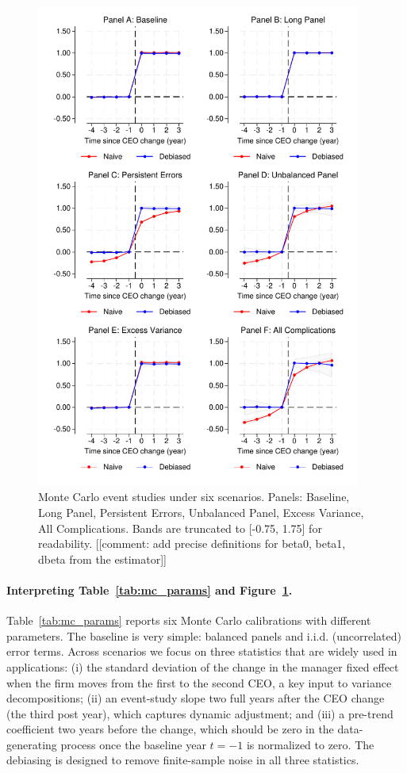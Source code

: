 \documentclass[11pt,a4paper]{article}
\begin{document}
\begin{figure}[htbp]
\centering
\includegraphics[width=0.95\textwidth]{figure/figuremc.pdf}
\caption{Monte Carlo event studies under six scenarios. Panels: Baseline, Long Panel, Persistent Errors, Unbalanced Panel, Excess Variance, All Complications. Bands are truncated to [-0.75, 1.75] for readability. [[comment: add precise definitions for beta0, beta1, dbeta from the estimator]]}
\label{fig:mc}
\end{figure}

\paragraph{Interpreting Table~\ref{tab:mc_params} and Figure~\ref{fig:mc}.}
Table~\ref{tab:mc_params} reports six Monte Carlo calibrations with different parameters. The baseline is very simple: balanced panels and i.i.d. (uncorrelated) error terms. Across scenarios we focus on three statistics that are widely used in applications: (i) the standard deviation of the change in the manager fixed effect when the firm moves from the first to the second CEO, a key input to variance decompositions; (ii) an event-study slope two full years after the CEO change (the third post year), which captures dynamic adjustment; and (iii) a pre-trend coefficient two years before the change, which should be zero in the data-generating process once the baseline year $t=-1$ is normalized to zero. The debiasing is designed to remove finite-sample noise in all three statistics.
\end{document}
